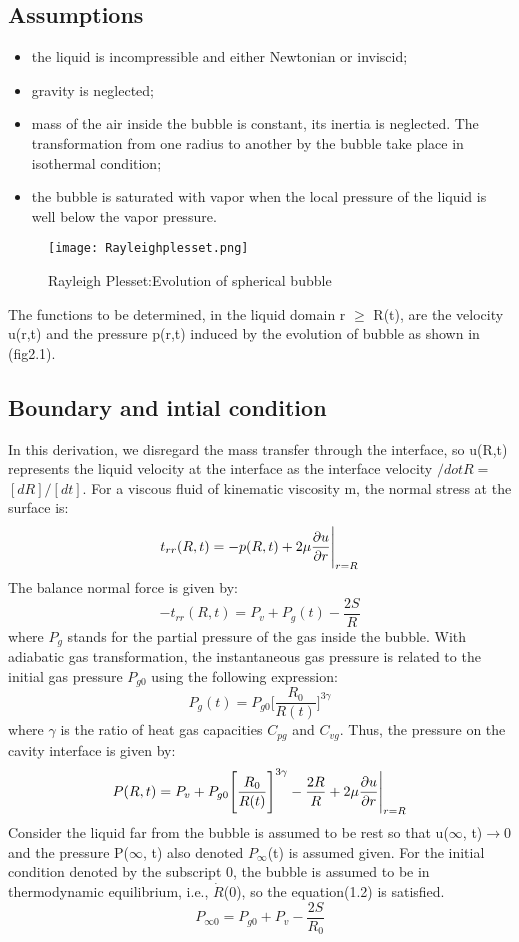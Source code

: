 \subsection{Assumptions}
\begin{itemize}
\item the liquid is incompressible and either Newtonian or inviscid;
\item gravity is neglected;
\item mass of the air inside the bubble is constant, its inertia is neglected. The transformation from one radius to another by the bubble take place in isothermal condition;
\item the bubble is saturated with vapor when the local pressure of the liquid is well below the vapor pressure.
\end{itemize}
\begin{figure}[H]
 \centering
 \texttt{[image: Rayleighplesset.png]}
 \caption{Rayleigh Plesset:Evolution of spherical bubble}
  \label{fig:fig13}
\end{figure}
The functions to be determined, in the liquid domain r $\ge$ R(t), are the velocity u(r,t) and the pressure p(r,t) induced by the evolution of bubble as shown in (fig2.1).
\subsection{Boundary and intial condition}
In this derivation, we disregard the mass transfer through the interface, so u(R,t) represents the liquid velocity at the interface as the interface velocity $/dot R=$$[dR]/[dt]$.
For a viscous fluid of kinematic viscosity m, the normal stress at the surface is:
\begin{equation}
{t_{rr}}(R,t)=-p(R,t)+2{\mu}{\frac{\partial{u}}{\partial{r}}}\Bigg{\vert}_{r=R}
\end{equation}
The balance normal force is given by:
\begin{equation}
-{t_{rr}}(R,t)=P_{v}+{P_{g}}(t)-{\frac{2S}{R}}
\end{equation}
where $P_g$ stands for the partial pressure of the gas inside the bubble. With adiabatic gas transformation, the instantaneous gas pressure is related to the initial gas pressure 
$P_{g0}$ using the following expression:
\begin{equation}
{P_{g}}(t)=P_{g0}\Bigg[\frac{R_0}{R(t)}\Bigg]^{3\gamma}
\end{equation}
where $\gamma$ is the ratio of heat gas capacities $C_{pg}$ and $C_{vg}$.
Thus, the pressure on the cavity interface is given by:
\begin{equation}
P(R,t)=P_{v}+P_{g0}\Bigg[{\frac{R_0}{R(t)}}\Bigg]^{3\gamma}-{\frac{2R}{R}}+2\mu{\frac{\partial{u}}{\partial{r}}}\Bigg{\vert}_{r=R}
\end{equation}
Consider the liquid far from the bubble is assumed to be rest so that u($\infty$, t)$\rightarrow$0 and the pressure P($\infty$, t) also denoted $P_{\infty}$(t) is assumed given.
For the initial condition denoted by the subscript 0, the bubble is assumed to be in thermodynamic equilibrium, i.e., $\dot{R}$(0), so the equation(1.2) is satisfied.
\begin{equation}
P_{{\infty}{0}} =P_{g0}+P_v-\frac{2S}{R_0}
\end{equation}
